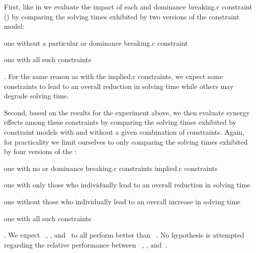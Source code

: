 First, like in  we evaluate
the impact of each  and \gls{dominance breaking.c}
\gls{constraint}
() by
comparing the solving times exhibited by two versions of the \gls{constraint
  model}:
%
\begin{modelList}
  \item {}
    one without a particular  or \gls{dominance
      breaking.c} \gls{constraint}
  \item {}
    one with all such \glspl{constraint}
\end{modelList}.
%
For the same reason as with the \gls{implied.c} \glspl{constraint}, we expect
some \glspl{constraint} to lead to an overall reduction in solving time while
others may degrade solving time.

Second, based on the results for the experiment above, we then evaluate synergy
effects among these \glspl{constraint} by comparing the solving times exhibited
by \glspl{constraint model} with and without a given combination of
\glspl{constraint}.
%
Again, for practicality we limit ourselves to only comparing the solving times
exhibited by four versions of the :
%
\begin{modelList}[resume]
  \item {}
    one with no  or \gls{dominance breaking.c}
    \glspl{constraint}
\gls{implied.c} \glspl{constraint}
  \item {}
    one with only those who individually lead to an overall reduction in solving
    time
  \item {}
    one without those who individually lead to an overall increase in solving
    time
  \item {}
    one with all such \glspl{constraint}
\end{modelList}.
%
We expect ~,
, and~ to all perform
better than ~.
%
No hypothesis is attempted regarding the relative performance between
~,
, and~.


